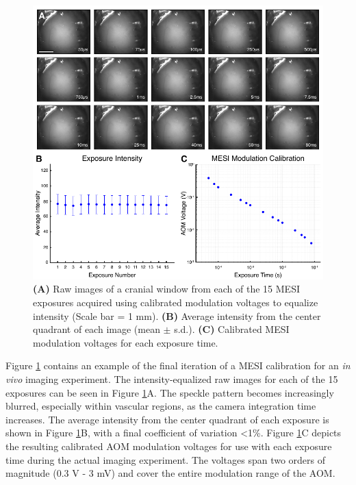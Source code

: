 \begin{figure}
    \includegraphics{figures/chapter_4/rawmesi.pdf}
    \caption{
        \label{fig:rawmesi}
        \textbf{(A)} Raw images of a cranial window from each of the 15 MESI exposures acquired using calibrated modulation voltages to equalize intensity (Scale bar = 1 mm). \textbf{(B)} Average intensity from the center quadrant of each image (mean $\pm$ s.d.). \textbf{(C)} Calibrated MESI modulation voltages for each exposure time.
    }
\end{figure}

Figure \ref{fig:rawmesi} contains an example of the final iteration of a MESI calibration for an \textit{in vivo} imaging experiment. The intensity-equalized raw images for each of the 15 exposures can be seen in Figure \ref{fig:rawmesi}A. The speckle pattern becomes increasingly blurred, especially within vascular regions, as the camera integration time increases. The average intensity from the center quadrant of each exposure is shown in Figure \ref{fig:rawmesi}B, with a final coefficient of variation \textless1\%. Figure \ref{fig:rawmesi}C depicts the resulting calibrated AOM modulation voltages for use with each exposure time during the actual imaging experiment. The voltages span two orders of magnitude (0.3 V - 3 mV) and cover the entire modulation range of the AOM.



